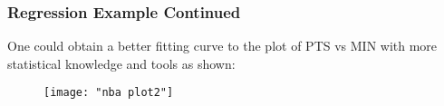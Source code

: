 \documentclass{beamer}
\begin{document}
\begin{frame}[fragile]\frametitle{Regression Example Continued}
	One could obtain a better fitting curve to the plot of PTS vs MIN with more statistical knowledge and tools as shown:
\begin{figure}
\centering
\texttt{[image: "nba plot2"]}
\label{fig:nba-plot2}
\end{figure}
\end{frame}
%

%
%	
%	
%	
%	
%
%
\end{document}
